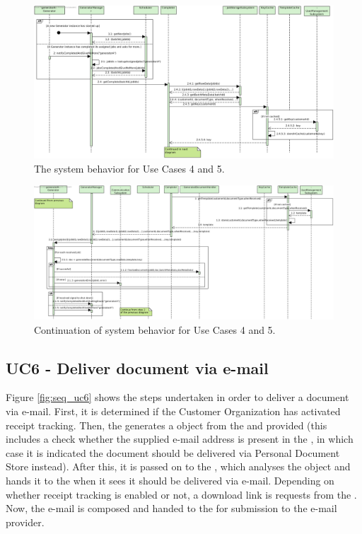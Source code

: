 \begin{figure}[!htp]
    \centering
    \includegraphics[width=\textwidth]{figures/UC4_5 - ProcessJobs1.png}
    \caption{The system behavior for Use Cases 4 and 5.
        }\label{fig:seq_uc45_1}
\end{figure}

\begin{figure}[!htp]
    \centering
    \includegraphics[width=\textwidth]{figures/UC4_5 - ProcessJobs2.png}
    \caption{Continuation of system behavior for Use Cases 4 and 5.
        }\label{fig:seq_uc45_2}
\end{figure}

\subsection{UC6 - Deliver document via e-mail}
Figure \ref{fig:seq_uc6} shows the steps undertaken in order to deliver a document via e-mail. First, it is determined if the Customer Organization has activated receipt tracking. Then, the  generates a  object from the  and  provided (this includes a check whether the supplied e-mail address is present in the , in which case it is indicated the document should be delivered via Personal Document Store instead). After this, it is passed on to the , which analyses the  object and hands it to the  when it sees it should be delivered via e-mail. Depending on whether receipt tracking is enabled or not, a download link is requests from the  . Now, the e-mail is composed and handed to the  for submission to the e-mail provider.

